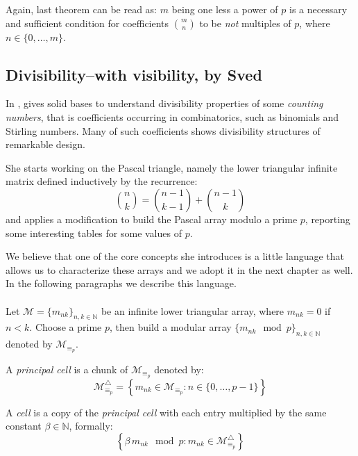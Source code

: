 Again, last theorem can be read as: \flqq $m$ being one less a power of $p$ is
a necessary and sufficient condition for coefficients ${{m}\choose{n}}$ to be
\emph{not} multiples of $p$, where $n\in\lbrace0,\ldots,m\rbrace$\frqq.


\subsection{Divisibility--with visibility, by Sved}

In \cite{sved:1988}, \citeauthor{sved:1988} gives solid bases to understand
divisibility properties of some \emph{counting numbers}, that is coefficients
occurring in combinatorics, such as binomials and Stirling numbers. Many of
such coefficients shows divisibility structures of remarkable design. 

She starts working on the Pascal triangle, namely the lower triangular infinite
matrix defined inductively by the recurrence: 
\begin{equation}
    {{n}\choose{k}}={{n-1}\choose{k-1}}+{{n-1}\choose{k}}
    \label{eq:binomial:recurrence}
\end{equation}
and applies a modification to build the Pascal array modulo a prime $p$, 
reporting some interesting tables for some values of $p$.

We believe that one of the core concepts she introduces is a little language
that allows us to characterize these arrays and we adopt it in the next chapter
as well. In the following paragraphs we describe this language. 
\\\\
Let $\mathcal{M}=\lbrace m_{nk}\rbrace_{n,k\in\mathbb{N}}$ 
be an infinite lower triangular array, where $m_{nk}=0$ if 
$n<k$. Choose a prime $p$, then build a modular array
$\lbrace m_{nk}\mod p\rbrace_{n,k\in\mathbb{N}}$ denoted by $\mathcal{M}_{\equiv_{p}}$.

A \emph{principal cell} is a chunk of $\mathcal{M}_{\equiv_{p}}$ denoted by:
\begin{displaymath}
    \mathcal{M}_{\equiv_{p}}^{\bigtriangleup} = 
        \left\lbrace m_{nk}\in \mathcal{M}_{\equiv_{p}}: n\in\lbrace 0,\ldots,p-1\rbrace\right\rbrace
\end{displaymath}

A \emph{cell} is a copy of the \emph{principal cell} with each entry multiplied 
by the same constant $\beta\in\mathbb{N}$, formally:
\begin{displaymath}
    \left\lbrace \beta\,m_{nk}\mod p:m_{nk}\in \mathcal{M}_{\equiv_{p}}^{\bigtriangleup}\right\rbrace
\end{displaymath}

